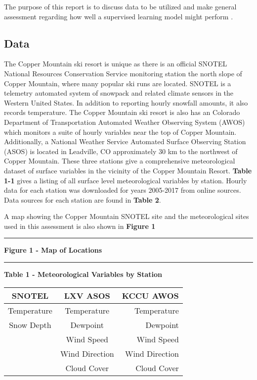 \documentclass[11pt]{article}
\begin{document}
The purpose of this report is to discuss data to be utilized and make
general assessment regarding how well a supervised learning model might
perform .

\subsection{Data}\label{data}

The Copper Mountain ski resort is unique as there is an official SNOTEL
National Resources Conservation Service monitoring station the north
slope of Copper Mountain, where many popular ski runs are located.
SNOTEL is a telemetry automated system of snowpack and related climate
sensors in the Western United States. In addition to reporting hourly
snowfall amounts, it also records temperature. The Copper Mountain ski
resort is also has an Colorado Department of Transportation Automated
Weather Observing System (AWOS) which monitors a suite of hourly
variables near the top of Copper Mountain. Additionally, a National
Weather Service Automated Surface Observing Station (ASOS) is located in
Leadville, CO approximately 30 km to the northwest of Copper Mountain.
These three stations give a comprehensive meteorological dataset of
surface variables in the vicinity of the Copper Mountain Resort.
\textbf{Table 1-1} gives a listing of all surface level meteorological
variables by station. Hourly data for each station was downloaded for
years 2005-2017 from online sources. Data sources for each station are
found in \textbf{Table 2}.

A map showing the Copper Mountain SNOTEL site and the meteorological
sites used in this assessment is also shown in \textbf{Figure 1}

\begin{center}\rule{0.5\linewidth}{\linethickness}\end{center}

\textbf{Figure 1 - Map of Locations}

\begin{center}\rule{0.5\linewidth}{\linethickness}\end{center}

\textbf{Table 1 - Meteorological Variables by Station}

\begin{longtable}[]{@{}ccr@{}}
\toprule
SNOTEL & LXV ASOS & KCCU AWOS\tabularnewline
\midrule
\endhead
Temperature & Temperature & Temperature\tabularnewline
Snow Depth & Dewpoint & Dewpoint\tabularnewline
& Wind Speed & Wind Speed\tabularnewline
& Wind Direction & Wind Direction\tabularnewline
& Cloud Cover & Cloud Cover\tabularnewline
\bottomrule
\end{longtable}
\end{document}
